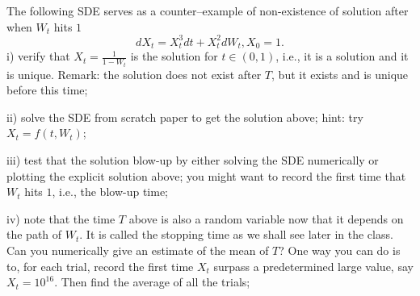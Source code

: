     \problem
    \begin{question}
        The following SDE serves as a counter--example of non-existence of solution after when $W_t$ hits $1$
        \[dX_t=X_t^3dt+X_t^2dW_t, X_0=1.\] 
        i) verify that $X_t=\frac{1}{1-W_t}$ is the solution for $t\in(0,1)$, i.e., it is a solution and it is unique.  Remark: the solution does not exist after $T$, but it exists and is unique before this time;
        
        ii) solve the SDE from scratch paper to get the solution above; hint: try $X_t=f(t,W_t)$; 
        
        iii) test that the solution blow-up by either solving the SDE numerically or plotting the explicit solution above; you might want to record the first time that $W_t$ hits $1$, i.e., the blow-up time; 
        
        iv) note that the time $T$ above is also a random variable now that it depends on the path of $W_t$.  It is called the stopping time as we shall see later in the class.  Can you numerically give an estimate of the mean of $T$?  One way you can do is to, for each trial, record the first time $X_t$ surpass a predetermined large value, say $X_t=10^{16}$.  Then find the average of all the trials;
    \end{question}
